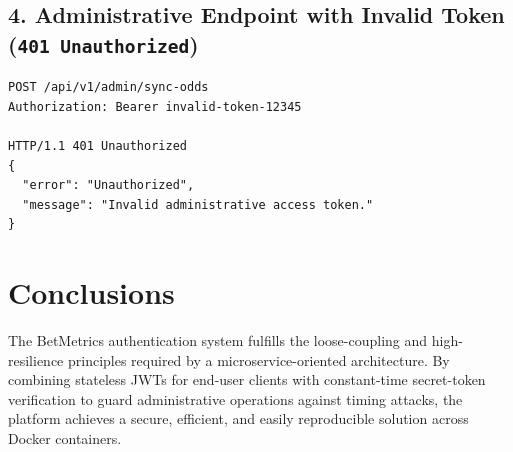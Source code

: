 \documentclass[11pt,a4paper]{article}
\begin{document}
\subsection{4. Administrative Endpoint with Invalid Token (\texttt{401 Unauthorized})}
\begin{lstlisting}
POST /api/v1/admin/sync-odds
Authorization: Bearer invalid-token-12345

HTTP/1.1 401 Unauthorized
{
  "error": "Unauthorized",
  "message": "Invalid administrative access token."
}
\end{lstlisting}

\section*{Conclusions}
The BetMetrics authentication system fulfills the loose-coupling and high-resilience principles required by a microservice-oriented architecture. By combining stateless JWTs for end-user clients with constant-time secret-token verification to guard administrative operations against timing attacks, the platform achieves a secure, efficient, and easily reproducible solution across Docker containers.
\end{document}
